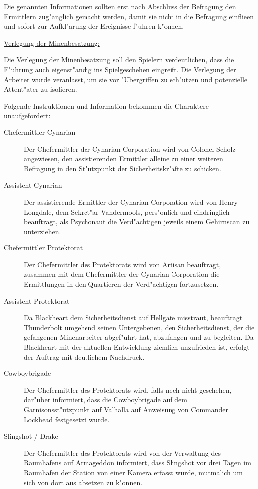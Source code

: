 \begin{remarks}
	Die genannten Informationen sollten erst nach Abschluss der Befragung den Ermittlern zug"anglich gemacht werden, damit sie nicht in die Befragung einflie\3en und sofort zur Aufkl"arung der Ereignisse f"uhren k"onnen.

	\underline{Verlegung der Minenbesatzung:}

	Die Verlegung der Minenbesatzung soll den Spielern verdeutlichen, dass die F"uhrung auch eigenst"andig ins Spielgeschehen eingreift. Die Verlegung der Arbeiter wurde veranlasst, um sie vor "Ubergriffen zu sch"utzen und potenzielle Attent"ater zu isolieren.
\end{remarks}


Folgende Instruktionen und Information bekommen die Charaktere unaufgefordert:

\begin{description}
	\item[Chefermittler Cynarian] Der Chefermittler der Cynarian Corporation wird von Colonel Scholz angewiesen, den assistierenden 
		Ermittler alleine zu einer weiteren Befragung in den St"utzpunkt der Sicherheitskr"afte zu schicken. 
	\item[Assistent Cynarian] Der assistierende Ermittler der Cynarian Corporation wird von Henry Longdale, dem Sekret"ar Vandermools, 
		pers"onlich und eindringlich beauftragt, als Psychonaut die Verd"achtigen jeweils einem Gehirnscan zu unterziehen.
	\item[Chefermittler Protektorat] Der Chefermittler des Protektorats wird von Artisan beauftragt, zusammen mit dem Chefermittler der 
		Cynarian Corporation die Ermittlungen in den Quartieren der Verd"achtigen fortzusetzen. 
	\item[Assistent Protektorat] Da Blackheart dem Sicherheitsdienst auf Hellgate misstraut, beauftragt Thunderbolt umgehend seinen 
		Untergebenen, den Sicherheitsdienst, der die gefangenen Minenarbeiter abgef"uhrt hat, abzufangen und zu begleiten. Da Blackheart mit der aktuellen Entwicklung ziemlich unzufrieden ist, erfolgt der Auftrag mit deutlichem Nachdruck. 
	\item[Cowboybrigade] Der Chefermittler des Protektorats wird, falls noch nicht geschehen, dar"uber informiert, dass die Cowboybrigade 
		auf dem Garnisonsst"utzpunkt auf Valhalla auf Anweisung von Commander Lockhead festgesetzt wurde.
	\item[Slingshot / Drake] Der Chefermittler des Protektorats wird von der Verwaltung des Raumhafens auf Armageddon informiert, dass 
		Slingshot vor drei Tagen im Raumhafen der Station von einer Kamera erfasst wurde, mutma\3lich um sich von dort aus absetzen zu k"onnen.
\end{description}

